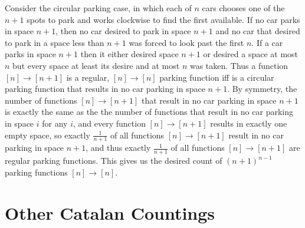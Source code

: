\documentclass{article}
\begin{document}
\begin{alphalist}
\item Consider the circular parking case, in which each of $n$ cars chooses one of the $n+1$ spots to park and works clockwise to find the first available. If no car parks in space $n+1$, then no car desired to park in space $n+1$ and no car that desired to park in a space less than $n+1$ was forced to look past the first $n$. If a car parks in space $n+1$ then it either desired space $n+1$ or desired a space at most $n$ but every space at least its desire and at most $n$ was taken. Thus a function $[n] \to [n+1]$ is a regular, $[n] \to [n]$ parking function iff is a circular parking function that results in no car parking in space $n+1$. By symmetry, the number of functions $[n] \to [n+1]$ that result in no car parking in space $n+1$ is exactly the same as the the number of functions that result in no car parking in space $i$ for any $i$, and every function $[n] \to [n+1]$ results in exactly one empty space, so exactly $\frac{1}{n+1}$ of all functions $[n] \to [n+1]$ result in no car parking in space $n+1$, and thus exactly $\frac{1}{n+1}$ of all functions $[n] \to [n+1]$ are regular parking functions. This gives us the desired count of $(n+1)^{n-1}$ parking functions $[n] \to [n]$. 
\end{alphalist}

\section{Other Catalan Countings}
\end{document}
